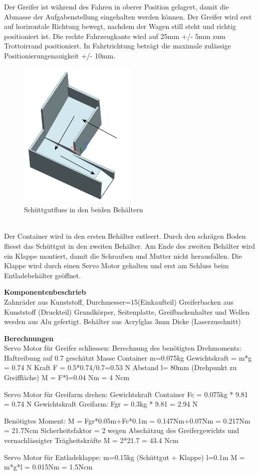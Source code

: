 Der Greifer ist während des Fahren in oberer Position gelagert, damit die Abmasse der Aufgabenstellung eingehalten werden können. Der Greifer wird erst auf horizontale Richtung bewegt, nachdem der Wagen still steht und richtig positioniert ist.
Die rechte Fahrzeugkante wird auf 25mm +/- 5mm zum Trottoirrand positioniert. In Fahrtrichtung beträgt die maximale zulässige Positionierungenauigkeit +/- 10mm.

\begin{figure}[H]
\centering
\includegraphics[width=0.5\textwidth]{03_Loesungskonzept/pictures/behaelter.png}
\caption{Schüttgutfluss in den beiden Behältern}
\end{figure}\\[0.2cm]

Der Container wird in den ersten Behälter entleert. Durch den schrägen Boden fliesst das Schüttgut in den zweiten Behälter. Am Ende des zweiten Behälter wird ein Klappe montiert, damit die Schrauben und Mutter nicht herausfallen. Die Klappe wird durch einen Servo Motor gehalten und erst am Schluss beim Entladebehälter geöffnet.

\textbf{Komponentenbeschrieb}
\\[0.2cm]
Zahnräder aus Kunststoff, Durchmesser=15(Einkaufteil)
Greiferbacken aus Kunststoff (Druckteil)
Grundkörper, Seitenplatte, Greifbackenhalter und Wellen werden aus Alu gefertigt.
Behälter aus Acrylglas 3mm Dicke (Laserzuschnitt)

\textbf{Berechnungen}
\\[0.2cm]
Servo Motor für Greifer schliessen:
Berechnung des benötigten Drehmoments: 
Haftreibung auf 0.7 geschätzt
Masse Container m=0.075kg
Gewichtskraft = m*g = 0.74 N
Kraft F = 0.5*0.74/0.7=0.53 N
Abstand l= 80mm (Drehpunkt zu Greiffläche)
M = F*l=0.04 Nm = 4 Ncm

Servo Motor für Greifarm drehen:
Gewichtskraft Container Fc = 0.075kg * 9.81 = 0.74 N
Gewichtskraft Greifarm: Fgr = 0.3kg * 9.81 = 2.94 N

Benötigtes Moment:
M = Fgr*0.05m+Fc*0.1m = 0.147Nm+0.07Nm = 0.217Nm = 21.7Ncm
Sicherheitsfaktor = 2 wegen Abschätzug des Greifergewichts und vernachlässigter Trägheitskräfte
M = 2*21.7 = 43.4 Ncm

Servo Motor für Entladeklappe:
m=0.15kg (Schüttgut + Klappe)
l=0.1m
M = m*g*l = 0.015Nm = 1.5Ncm